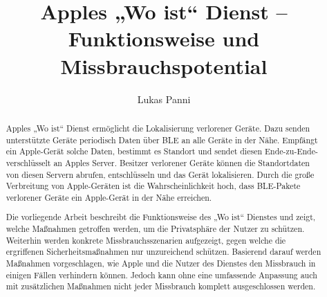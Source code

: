 \documentclass[runningheads]{llncs}
\begin{document}
\title{Apples „Wo ist“ Dienst – Funktionsweise und Missbrauchspotential}


\author{Lukas Panni}


\maketitle              %

\begin{abstract}
Apples „Wo ist“ Dienst ermöglicht die Lokalisierung verlorener Geräte.
Dazu senden unterstützte Geräte periodisch Daten über \ac{BLE} an alle Geräte in der Nähe.
Empfängt ein Apple-Gerät solche Daten, bestimmt es Standort und sendet diesen Ende-zu-Ende-verschlüsselt an Apples Server.
Besitzer verlorener Geräte können die Standortdaten von diesen Servern abrufen, entschlüsseln und das Gerät lokalisieren.
Durch die große Verbreitung von Apple-Geräten ist die Wahrscheinlichkeit hoch, dass \ac{BLE}-Pakete verlorener Geräte ein Apple-Gerät in der Nähe erreichen.

Die vorliegende Arbeit beschreibt die Funktionsweise des „Wo ist“ Dienstes und zeigt, welche Maßnahmen getroffen werden, um die Privatsphäre der Nutzer zu schützen.
Weiterhin werden konkrete Missbrauchsszenarien aufgezeigt, gegen welche die ergriffenen Sicherheitsmaßnahmen nur unzureichend schützen.
Basierend darauf werden Maßnahmen vorgeschlagen, wie Apple und die Nutzer des Dienstes den Missbrauch in einigen Fällen verhindern können.
Jedoch kann ohne eine umfassende Anpassung auch mit zusätzlichen Maßnahmen nicht jeder Missbrauch komplett ausgeschlossen werden.
\end{abstract}




\newpage









\end{document}

